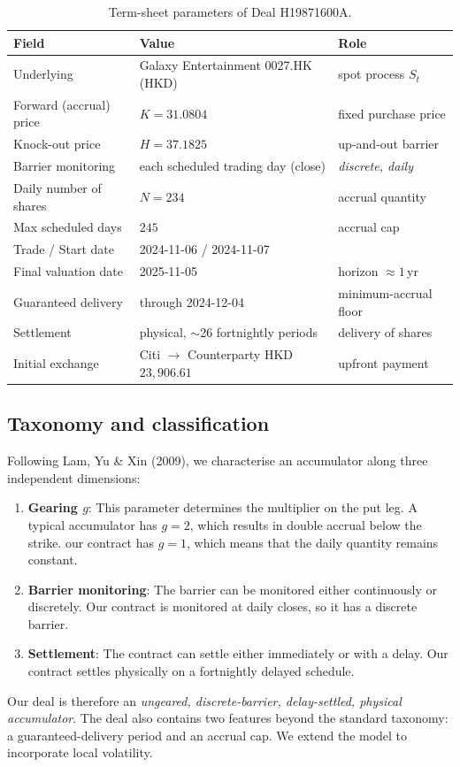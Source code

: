 \documentclass[11pt]{article}
\begin{document}
\begin{table}[h]
\centering
\small
\begin{tabular}{@{}lll@{}}
\toprule
\textbf{Field} & \textbf{Value} & \textbf{Role} \\
\midrule
Underlying               & Galaxy Entertainment 0027.HK (HKD) & spot process $S_t$ \\
Forward (accrual) price  & $K = 31.0804$ & fixed purchase price \\
Knock-out price          & $H = 37.1825$ & up-and-out barrier \\
Barrier monitoring       & each scheduled trading day (close) & \emph{discrete, daily} \\
Daily number of shares   & $N = 234$ & accrual quantity \\
Max scheduled days       & $245$ & accrual cap \\
Trade / Start date       & 2024-11-06 / 2024-11-07 & \\
Final valuation date     & 2025-11-05 & horizon $\approx 1$\,yr \\
Guaranteed delivery      & through 2024-12-04 & minimum-accrual floor \\
Settlement               & physical, $\sim$26 fortnightly periods & delivery of shares \\
Initial exchange         & Citi $\to$ Counterparty HKD $23{,}906.61$ & upfront payment \\
\bottomrule
\end{tabular}
\caption{Term-sheet parameters of Deal H19871600A.}
\label{tab:terms}
\end{table}

\subsection{Taxonomy and classification}
Following Lam, Yu \& Xin (2009), we characterise an accumulator along three independent dimensions:
\begin{enumerate}[leftmargin=1.5em,itemsep=1pt]
  \item \textbf{Gearing $g$}: This parameter determines the multiplier on the put leg. A typical accumulator has
        $g=2$, which results in double accrual below the strike. our contract has \textbf{$g=1$}, which means that the daily quantity remains constant.
  \item \textbf{Barrier monitoring}: The barrier can be monitored either continuously or discretely. Our contract is monitored at daily closes, so it has a discrete barrier.
  \item \textbf{Settlement}: The contract can settle either immediately or with a delay. Our contract settles physically on a fortnightly delayed schedule.
\end{enumerate}
Our deal is therefore an \emph{ungeared, discrete-barrier, delay-settled, physical accumulator}.
The deal also contains two features beyond the standard taxonomy: a guaranteed-delivery period and an accrual cap. We extend the model to incorporate local volatility.
\end{document}
